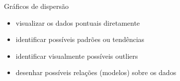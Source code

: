 \documentclass{beamer}
\begin{document}

\begin{frame}{Gráficos de dispersão}
  \begin{itemize}
    \footnotesize
  \item visualizar os dados pontuais diretamente
    \bigskip
  \item identificar possíveis padrões ou tendências
    \bigskip
  \item identificar visualmente possíveis outliers
    \bigskip
  \item desenhar possíveis relações (modelos) sobre os dados
  \end{itemize}
\end{frame}
\end{document}
